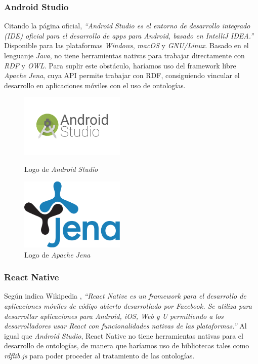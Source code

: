 \subsubsection{Android Studio}
Citando la página oficial, \textit{“Android Studio es el entorno de desarrollo integrado (\textnormal{IDE}) oficial para el desarrollo 
de apps para Android, basado en \textnormal{IntelliJ IDEA}.”} \autocite*{AndroidStudio2019}
Disponible para las plataformas \textit{Windows}, \textit{macOS} y \textit{GNU/Linux}. Basado en el lenguanje \textit{Java},
no tiene herramientas nativas para trabajar directamente con \textit{RDF} y \textit{OWL}. Para suplir este obstáculo, 
haríamos uso del framework libre \textit{Apache Jena}, cuya API permite trabajar con RDF, consiguiendo vincular 
el desarrollo en aplicaciones móviles con el uso de ontologías.

\begin{figure}[H]
    \centering
    \begin{minipage}{5cm}
        \centering
        \includegraphics[width=5cm]{Images/Logo_Android_Studio.png}
        \caption{Logo de \textit{Android Studio}}  
    \end{minipage}
    \hfill
    \begin{minipage}{5cm}
        \centering
        \includegraphics[width=5cm]{Images/Logo_Jena.png}
        \caption{Logo de \textit{Apache Jena}}  
    \end{minipage}
\end{figure}

\subsubsection{React Native}
Según indica Wikipedia \autocite*{ReactNative}, \textit{“React Native es un \textit{framework} para el desarrollo de aplicaciones móviles de código abierto desarrollado por 
\textit{Facebook}. Se utiliza para desarrollar aplicaciones para \textit{Android}, \textit{iOS}, \textit{Web} y 
\textit{U} permitiendo a los desarrolladores usar \textit{React} con funcionalidades nativas de las plataformas.”}
Al igual que \textit{Android Studio}, React Native no tiene herramientas nativas para el desarrollo de ontologías, de 
manera que haríamos uso de bibliotecas tales como \textit{rdflib.js} para poder proceder al tratamiento de las ontologías.

